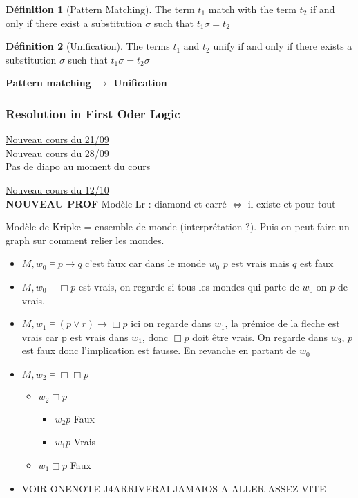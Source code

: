 \documentclass{article}
\theoremstyle{plain}%
\theoremstyle{definition}
\newtheorem{defn}{Définition}[section]
\theoremstyle{remark}
\begin{document}
\begin{defn}[Pattern Matching]
    The term $ t_1 $ match with the term $ t_2 $ if and only if there exist a substitution $ \sigma  $ such that $ t_1 \sigma = t_2 $ 
\end{defn}
\begin{defn}[Unification]
    The terms $ t_1 $ and $ t_2 $  unify if and only if there exists a substitution $ \sigma  $ such that $ t_1 \sigma = t_2 \sigma  $ 
\end{defn}
\textbf{Pattern matching $\rightarrow$ Unification}

\subsubsection{Resolution in First Oder Logic}

\underline{Nouveau cours du 21/09} \\
\underline{Nouveau cours du 28/09} \\
Pas de diapo au moment du cours

\underline{Nouveau cours du 12/10} \\
\textbf{NOUVEAU PROF}
Modèle Lr : diamond et carré $\Leftrightarrow$ il existe et pour tout 

Modèle de Kripke = ensemble de monde (interprétation ?). Puis on peut faire un graph sur comment relier les mondes. \begin{itemize}
    \item $ M, w_0\models p \rightarrow q $ c'est faux car dans le monde $ w_0 $ $ p $ est vrais mais $ q $ est faux
    \item $ M, w_0\models \Box p $ est vrais, on regarde si tous les mondes qui parte de $ w_0 $ on $ p $ de vrais.
    \item $ M, w_1 \models (p \vee r) \rightarrow \Box p$ ici on regarde dans $ w_1 $, la prémice de la fleche est vrais car p est vrais dans $ w_1 $, donc $ \Box p $ doit être vrais. On regarde dans $ w_3 $, $ p $ est faux donc l'implication est fausse. En revanche en partant de $ w_0 $ 
    \item $ M, w_2 \models \Box \Box p $ \begin{itemize}
        \item $w_2 \Box p$ \begin{itemize}
            \item $ w_2 p  $ Faux
            \item $ w_1 p  $ Vrais
        \end{itemize}
        \item $w_1 \Box p$ Faux
    \end{itemize}
    \item VOIR ONENOTE J4ARRIVERAI JAMAIOS A ALLER ASSEZ VITE 
\end{itemize}
\end{document}
